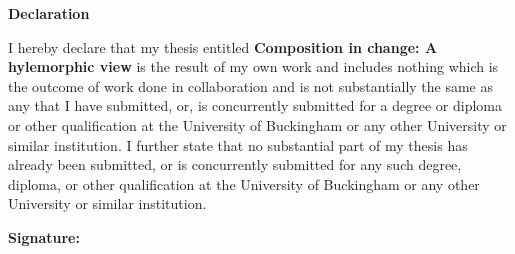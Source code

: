 \newpage

\begin{center}
{\Large \bf Declaration}
\end{center}

I hereby declare that my thesis entitled {\bf Composition in change: A hylemorphic view} is the result of my own work and includes nothing which is the outcome of work done in collaboration and is not substantially the same as any that I have submitted, or, is concurrently submitted for a degree or diploma or other qualification at the University of Buckingham or any other University or similar institution. I further state that no substantial part of my thesis has already been submitted, or is concurrently submitted for any such degree, diploma, or other qualification at the University of Buckingham or any other University or similar institution.

{\bf Signature:}
